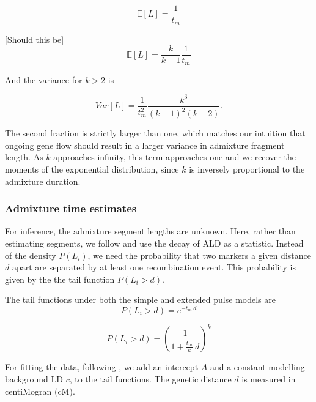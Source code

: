 \documentclass[]{article}
\begin{document}
\begin{equation}
\label{eq:Expected_l_extended_pulse}
\mathbb{E}[L] = \frac{1}{t_{m}}
\end{equation}

[Should this be]
\begin{equation}
\label{eq:Expected_l_extended_pulse}
\mathbb{E}[L] = \frac{k}{k-1}\frac{1}{t_{m}}
\end{equation}

And the variance for $k>2$ is 

\begin{equation}
\label{eq:Var_l_extended_pulse}
Var[L] = \frac{1}{t_m^2}\frac{k^3}{(k-1)^2(k-2)}\text{.}
\end{equation}


The second fraction is strictly larger than one, which matches our intuition that ongoing gene flow should result in a larger variance in admixture fragment length. As $k$ approaches infinity, this term approaches one and we recover the moments of the exponential distribution, since $k$ is inversely proportional to the admixture duration.




\subsubsection{Admixture time estimates}\label{admixture time estimates}
For inference, the admixture segment lengths are unknown. Here, rather than estimating segments, we follow \cite{moorjani_history_2011} and use the decay of ALD  as a statistic. Instead of the density $P(L_i)$, we need the probability that two markers a given distance $d$ apart are separated by at least one recombination event. This probability is given by the the tail function $P(L_i > d)$.

The tail functions under both the simple and extended pulse models are 
\begin{equation}
\label{eq:simple_pulse_tail}
P(L_i > d) = e^{-t_m \:d}
\end{equation}

\begin{equation}
\label{eq:extended_pulse_tail}
P(L_i > d) = \left( \frac{1}{1 + \frac{t_m}{k} \:d}\right) ^k
\end{equation}

For fitting the data, following \cite{moorjani_genetic_2016}, we add an intercept $A$ and a constant modelling background LD $c$, to the tail functions. The genetic distance $d$ is measured in centiMogran (cM).
\end{document}
